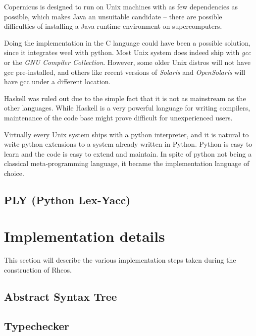 Copernicus is designed to run on Unix machines with as few
dependencies as possible, which makes Java an unsuitable candidate --
there are possible difficulties of installing a Java runtime
environment on supercomputers.

Doing the implementation in the C language could have been a possible
solution, since it integrates weel with python. Most Unix system does
indeed ship with \emph{gcc} or the \emph{GNU Compiler
  Collection}. However, some older Unix distros will not have gcc
pre-installed, and others like recent versions of \emph{Solaris} and
\emph{OpenSolaris} will have gcc under a different location.

Haskell was ruled out due to the simple fact that it is not as
mainstream as the other languages. While Haskell is a very powerful
language for writing compilers, maintenance of the code base might
prove difficult for unexperienced users.

Virtually every Unix system ships with a python interpreter, and it is
natural to write python extensions to a system already written in
Python. Python is easy to learn and the code is easy to extend and
maintain. In spite of python not being a classical meta-programming
language, it became the implementation language of choice.


\subsection{PLY (Python Lex-Yacc)}\label{sec:ply}



\section{Implementation details}
This section will describe the various implementation steps taken
during the construction of Rheos.

\subsection{Abstract Syntax Tree}\label{sec:ast}



\subsection{Typechecker}\label{sec:typechecker}



